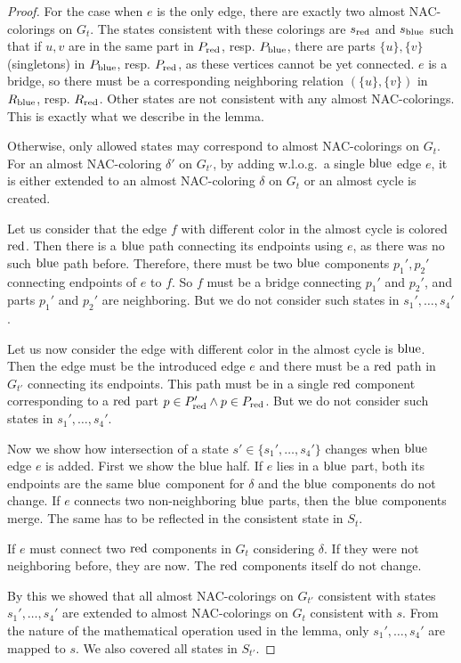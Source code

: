 %
\begin{proof}
	For the case when \( e \) is the only edge,
	there are exactly two almost NAC-colorings on \( G_t \).
	The states consistent with these colorings are \( s_{\text{red}} \) and \( s_{\text{blue}} \)
	such that if \( u, v \) are in the same part in \( P_{\text{red}} \), resp. \( P_{\text{blue}} \),
	there are parts \( \{u\}, \{v\} \) (singletons) in \( P_{\text{blue}} \), resp. \( P_{\text{red}} \),
	as these vertices cannot be yet connected.
	\( e \) is a bridge, so there must be a corresponding neighboring
	relation \( (\{u\}, \{v\}) \) in \( R_{\text{blue}} \), resp. \( R_{\text{red}} \).
	Other states are not consistent with any almost NAC-colorings.
	This is exactly what we describe in the lemma.

	Otherwise, only allowed states may correspond to almost NAC-colorings on \( G_t \).
	For an almost NAC-coloring \( \delta' \) on \( G_{t'} \),
	by adding w.l.o.g.\ a single \( \text{blue} \) edge \( e \),
	it is either extended to an almost NAC-coloring \( \delta \) on \( G_t \)
	or an almost cycle is created.

	Let us consider that the edge \( f \) with different color
	in the almost cycle is colored \( \text{red} \).
	Then there is a \( \text{blue} \) path connecting its endpoints using \( e \),
	as there was no such \( \text{blue} \) path before.
	Therefore, there must be two \( \text{blue} \) components \( p_1', p_2' \)
	connecting endpoints of \( e \) to \( f \).
	So \( f \) must be a bridge connecting \( p_1' \) and \( p_2' \),
	and parts \( p_1' \) and \( p_2' \) are neighboring.
	But we do not consider such states in \( s_1', \dots, s_4' \).

	Let us now consider the edge with different color in the almost cycle is \( \text{blue} \).
	Then the edge must be the introduced edge \( e \) and
	there must be a \( \text{red} \) path in \( G_{t'} \) connecting its endpoints.
	This path must be in a single \( \text{red} \) component corresponding
	to a \( \text{red} \) part \( p \in P_{\text{red}}' \land p \in P_{\text{red}} \).
	But we do not consider such states in \( s_1', \dots, s_4' \).

	Now we show how intersection of a state \( s' \in \{s_1', \dots, s_4'\} \)
	changes when \( \text{blue} \) edge \( e \) is added.
	First we show the blue half.
	If \( e \) lies in a \( \text{blue} \) part,
	both its endpoints are the same \( \text{blue} \) component
	for \( \delta \) and the \( \text{blue} \) components do not change.
	If \( e \) connects two non-neighboring \( \text{blue} \) parts,
	then the \( \text{blue} \) components merge. The same has to be reflected in
	the consistent state in \( S_t \).

	If \( e \) must connect two \( \text{red} \) components in \( G_t \)
	considering \( \delta \).
	If they were not neighboring before, they are now.
	The \( \text{red} \) components itself do not change.

	By this we showed that all almost NAC-colorings on \( G_{t'} \) consistent with
	states \( s_1', \dots, s_4' \) are extended to almost NAC-colorings on \( G_t \)
	consistent with \( s \).
	From the nature of the mathematical operation used in the lemma,
	only \( s_1', \dots, s_4' \) are mapped to \( s \).
	We also covered all states in \( S_{t'} \).
\end{proof}

